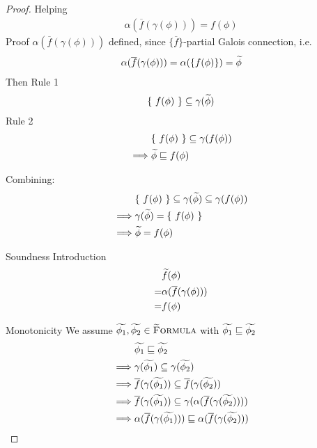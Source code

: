 \begin{proof}
    Helping
        \begin{align*}
        \alpha(\overline{f}(\gamma(\phi))) = f(\phi)
        \end{align*}
    Proof
        $\alpha(\overline{f}(\gamma(\phi)))$ defined, since $\{ \overline{f} \}$-partial Galois connection, i.e.
        \begin{align*}
        \alpha(\overline{f}(\gamma(\phi))) = \alpha(\{ f(\phi) \}) = \widetilde{\phi}
        \end{align*}
        Then
        Rule 1
        \begin{align*}
        &\{~ f(\phi) ~\} \subseteq \gamma(\widetilde{\phi})\\
        \end{align*}
        Rule 2
        \begin{align*}
        &\{~ f(\phi) ~\} \subseteq \gamma(f(\phi))\\
        \implies
        & \widetilde{\phi} \sqsubseteq f(\phi)
        \end{align*}
        
        Combining:
        \begin{align*}
        &\{~ f(\phi) ~\} \subseteq \gamma(\widetilde{\phi}) \subseteq \gamma(f(\phi))\\
        \implies
        & \gamma(\widetilde{\phi}) = \{~ f(\phi) ~\}\\
        \implies
        & \widetilde{\phi} = f(\phi)
        \end{align*}
        
    Soundness
        Introduction
        \begin{align*}
        &\widetilde{f}(\phi)\\
        = 
        &\alpha(\overline{f}(\gamma(\phi)))\\
        = 
        &f(\phi)
        \end{align*}
        
        Monotonicity
        We assume $\widetilde{\phi_1}, \widetilde{\phi_2} \in \textup{\textsc{\ensuremath{\widetilde{\text{F}}}ormula}}$ with $\widetilde{\phi_1} \sqsubseteq \widetilde{\phi_2}$
        \begin{align*}
        &\grad{\phi_1} \mpt \grad{\phi_2}\\
        \implies
        &\gamma(\grad{\phi_1}) \subseteq \gamma(\grad{\phi_2})\\
        \implies
        &\overline{f}(\gamma(\grad{\phi_1})) \subseteq \overline{f}(\gamma(\grad{\phi_2}))\\
        \implies %
        &\overline{f}(\gamma(\grad{\phi_1})) \subseteq \gamma(\alpha(\overline{f}(\gamma(\grad{\phi_2}))))\\
        \implies %
        &\alpha(\overline{f}(\gamma(\grad{\phi_1}))) \mpt \alpha(\overline{f}(\gamma(\grad{\phi_2})))\\
        \end{align*}
    

\end{proof}
